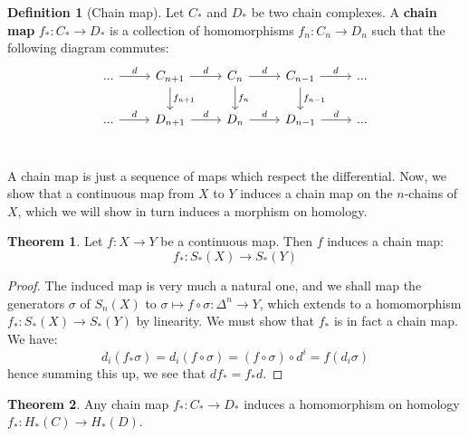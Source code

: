 \documentclass[11pt, oneside]{amsart}   	%
\theoremstyle{definition}
\newtheorem{definition}{Definition}[section]
\newtheorem{theorem}{Theorem}[section]
\begin{document}
\begin{definition}[Chain map]
	Let $C_*$ and $D_*$ be two chain complexes. A \textbf{chain map} $f_* : C_*\rightarrow D_*$ is a collection of 
	homomorphisms $f_n : C_n\rightarrow D_n$ such that the following diagram commutes:
	\begin{equation}\begin{tikzcd}
	...\arrow[r, "d"] & C_{n + 1}\arrow[d, "f_{n + 1}"]\arrow[r, "d"] & C_n\arrow[d, "f_n"]\arrow[r, "d"] & C_{n - 1}\arrow[d, 
	"f_{n - 1}"]\arrow[r, "d"] & ... \\
	...\arrow[r, "d"] & D_{n + 1}\arrow[r, "d"] & D_n\arrow[r, "d"] & D_{n - 1}\arrow[r, "d"] & ... \\
	\end{tikzcd}\end{equation}
\end{definition}

A chain map is just a sequence of maps which respect the differential. Now, we show that a continuous map from $X$ to $Y$ 
induces a chain map on the $n$-chains of $X$, which we will show in turn induces a morphism on homology. 

\begin{theorem}
	Let $f : X\rightarrow Y$ be a continuous map. Then $f$ induces a chain map:
	\begin{equation}
		f_* : S_*(X)\rightarrow S_*(Y)
	\end{equation}
\end{theorem}

\begin{proof}
	The induced map is very much a natural one, and we shall map the generators $\sigma$ of $S_n(X)$ to $\sigma\mapsto 
	f\circ\sigma : \Delta^n\rightarrow Y$, which extends to a homomorphism $f_* : S_*(X)\rightarrow S_*(Y)$ by linearity. We 
	must show that $f_*$ is in fact a chain map. We have:
	\begin{equation}
		d_i (f_*\sigma) = d_i (f\circ\sigma) = (f\circ\sigma)\circ d^i = f(d_i\sigma)
	\end{equation}
	hence summing this up, we see that $df_* = f_*d$. 
\end{proof}

\begin{theorem}
	Any chain map $f_* : C_*\rightarrow D_*$ induces a homomorphism on homology $f_* : H_*(C)\rightarrow H_*(D)$. 
\end{theorem}
\end{document}
